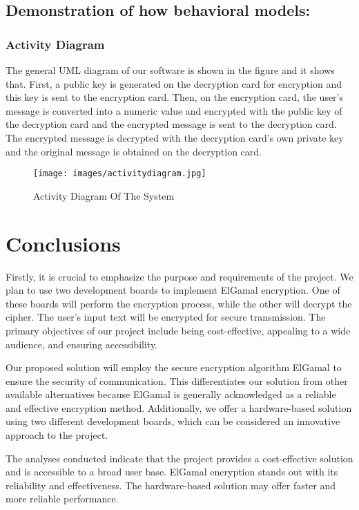 \documentclass[12pt]{article}
\begin{document}
\vskip 10cm
\subsection{Demonstration of how behavioral models:}
	
	\subsubsection{Activity Diagram}
 	The general UML diagram of our software is shown in the figure and it shows that. First, a public key is generated on the decryption card for encryption and this key is sent to the encryption card. Then, on the encryption card, the user's message is converted into a numeric value and encrypted with the public key of the decryption card and the encrypted message is sent to the decryption card. The encrypted message is decrypted with the decryption card's own private key and the original message is obtained on the decryption card.
 	
 	\begin{figure}[H]
 		\centering
 		\label{Uml Diagram Of The System}
 		\texttt{[image: images/activitydiagram.jpg]}\\[0.5 cm]	
 		\caption{Activity Diagram Of The System} 		
 	\end{figure}
 	\newpage
	\section{Conclusions}
	
	Firstly, it is crucial to emphasize the purpose and requirements of the project. We plan to use two development boards to implement ElGamal encryption. One of these boards will perform the encryption process, while the other will decrypt the cipher. The user's input text will be encrypted for secure transmission. The primary objectives of our project include being cost-effective, appealing to a wide audience, and ensuring accessibility.
	
	Our proposed solution will employ the secure encryption algorithm ElGamal to ensure the security of communication. This differentiates our solution from other available alternatives because ElGamal is generally acknowledged as a reliable and effective encryption method. Additionally, we offer a hardware-based solution using two different development boards, which can be considered an innovative approach to the project.
	
	The analyses conducted indicate that the project provides a cost-effective solution and is accessible to a broad user base. ElGamal encryption stands out with its reliability and effectiveness. The hardware-based solution may offer faster and more reliable performance.
	
\end{document}
